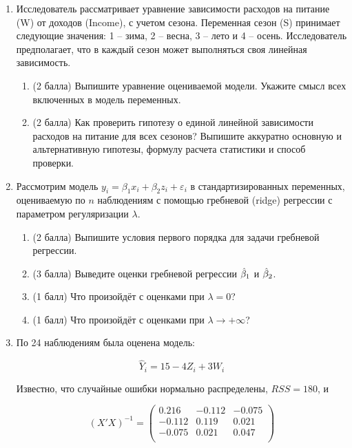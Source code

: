 \begin{enumerate}
\item Исследователь рассматривает уравнение зависимости расходов на питание (W) от доходов (Income), с учетом сезона. Переменная сезон (S) принимает следующие значения: 1 – зима, 2 – весна, 3 – лето и 4 – осень. Исследователь предполагает, что в каждый сезон может выполняться своя линейная зависимость. 

\begin{enumerate}
    \item (2 балла) Выпишите уравнение оцениваемой модели. Укажите смысл всех включенных в модель переменных.
    \item (2 балла) Как проверить гипотезу о единой линейной зависимости расходов на питание для всех сезонов? Выпишите аккуратно основную и альтернативную гипотезы, формулу расчета статистики и способ проверки.
\end{enumerate}

\item Рассмотрим модель $y_i = \beta_1 x_i + \beta_2 z_i + \varepsilon_i$ в стандартизированных переменных, оцениваемую по $n$ наблюдениям с помощью гребневой (ridge) регрессии с параметром регуляризации $\lambda$. 

\begin{enumerate}
    \item (2 балла) Выпишите условия первого порядка для задачи гребневой регрессии.
    \item (3 балла) Выведите оценки гребневой регрессии $\hat{\beta}_1$ и $\hat{\beta}_2$.
    \item (1 балл) Что произойдёт с оценками при $\lambda = 0$?
    \item (1 балл) Что произойдёт с оценками при $\lambda \to +\infty$?
\end{enumerate}



\item По 24 наблюдениям была оценена модель:

\[
\widehat{Y}_i=15-4Z_i+3W_i
\]

Известно, что случайные ошибки нормально распределены, $RSS=180$, и

\[
(X'X)^{-1} =
\begin{pmatrix}{}
  0.216 & -0.112 & -0.075 \\ 
  -0.112 & 0.119 & 0.021 \\ 
  -0.075 & 0.021 & 0.047 \\ 
  \end{pmatrix}
\]



\end{enumerate}
